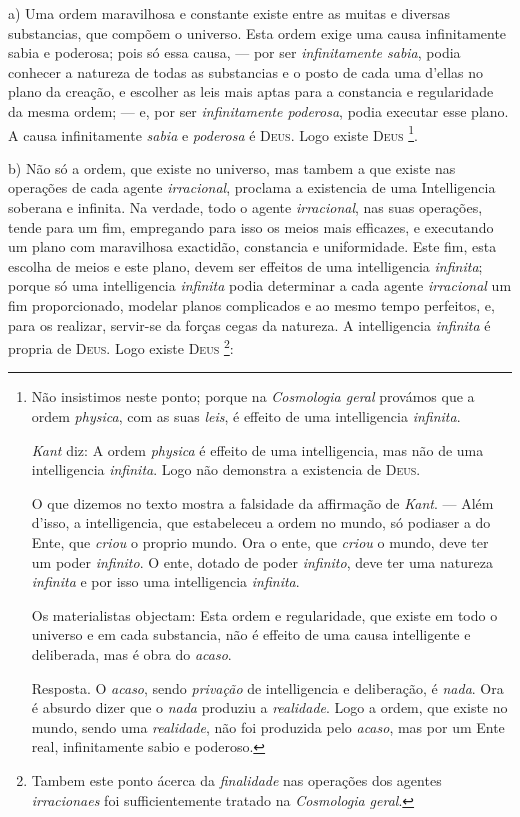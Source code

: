a) Uma ordem maravilhosa e constante existe entre as muitas e diversas substancias, que compõem o universo. Esta ordem exige uma causa infinitamente sabia e poderosa; pois só essa causa, --- por ser \emph{infinitamente sabia}, podia conhecer a natureza de todas as substancias e o posto de cada uma d'ellas no plano da creação, e escolher as leis mais aptas para a constancia e regularidade da mesma ordem; --- e, por ser \emph{infinitamente poderosa}, podia executar esse plano. A causa infinitamente \emph{sabia} e \emph{poderosa} é \textsc{Deus}. Logo existe \textsc{Deus} \footnote{Não insistimos neste ponto; porque na \emph{Cosmologia geral} provámos que a ordem \emph{physica}, com as suas \emph{leis}, é effeito de uma intelligencia \emph{infinita}.\par \emph{Kant} diz: A ordem \emph{physica} é effeito de uma intelligencia, mas não de uma intelligencia \emph{infinita}. Logo não demonstra a existencia de \textsc{Deus}.\par O que dizemos no texto mostra a falsidade da affirmação de \emph{Kant}. --- Além d'isso, a intelligencia, que estabeleceu a ordem no mundo, só podiaser a do Ente, que \emph{criou} o proprio mundo. Ora o ente, que \emph{criou} o mundo, deve ter um poder \emph{infinito}. O ente, dotado de poder \emph{infinito}, deve ter uma natureza \emph{infinita} e por isso uma intelligencia \emph{infinita}.\par Os materialistas objectam: Esta ordem e regularidade, que existe em todo o universo e em cada substancia, não é effeito de uma causa intelligente e deliberada, mas é obra do \emph{acaso}.\par Resposta. O \emph{acaso}, sendo \emph{privação} de intelligencia e deliberação, é \emph{nada}. Ora é absurdo dizer que o \emph{nada} produziu a \emph{realidade}. Logo a ordem, que existe no mundo, sendo uma \emph{realidade}, não foi produzida pelo \emph{acaso}, mas por um Ente real, infinitamente sabio e poderoso.}.

b) Não só a ordem, que existe no universo, mas tambem a que existe nas operações de cada agente \emph{irracional}, proclama   a existencia de uma Intelligencia soberana e infinita. Na verdade, todo o agente \emph{irracional}, nas suas operações, tende para um fim, empregando para isso os meios mais efficazes, e executando um plano com maravilhosa exactidão, constancia e uniformidade. Este fim, esta escolha de meios e este plano, devem ser effeitos de uma intelligencia \emph{infinita}; porque só uma intelligencia \emph{infinita} podia determinar a cada agente \emph{irracional} um fim proporcionado, modelar planos complicados e ao mesmo tempo perfeitos, e, para os realizar, servir-se da forças cegas da natureza. A intelligencia \emph{infinita} é propria de \textsc{Deus}. Logo existe \textsc{Deus} \footnote{Tambem este ponto ácerca da \emph{finalidade} nas operações dos agentes \emph{irracionaes} foi sufficientemente tratado na \emph{Cosmologia geral}.}:

